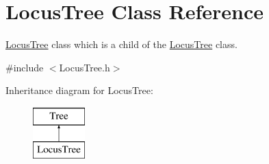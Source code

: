 \hypertarget{class_locus_tree}{}\section{Locus\+Tree Class Reference}
\label{class_locus_tree}


\mbox{\hyperlink{class_locus_tree}{Locus\+Tree}} class which is a child of the \mbox{\hyperlink{class_locus_tree}{Locus\+Tree}} class.  




{\ttfamily \#include $<$Locus\+Tree.\+h$>$}

Inheritance diagram for Locus\+Tree\+:\begin{figure}[H]
\begin{center}
\leavevmode
\includegraphics[height=2.000000cm]{class_locus_tree}
\end{center}
\end{figure}
